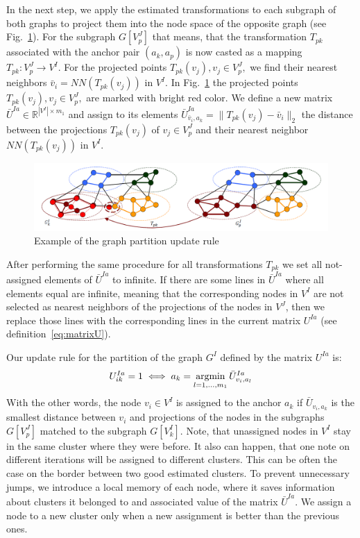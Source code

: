 In the next step, we apply the estimated transformations to each subgraph of both graphs to project them into the node space of the opposite graph (see Fig.~\ref{fig:update}). For the subgraph $G[V^J_p]$ that means, that the transformation $T_{pk}$ associated with the anchor pair $(a_k,a_p)$ is now casted as a mapping $T_{pk}:V^J_p\rightarrow V^I$. For the projected points $T_{pk}(v_j),v_j\in V^J_p,$ we find their nearest neighbors $\bar{v}_i=NN(T_{pk}(v_j))$ in $V^I$. In Fig.~\ref{fig:update} the projected points $T_{pk}(v_j),v_j\in V^J_p,$ are marked with bright red color. We define a new matrix $\bar{U}^{Ia}\in\mathbb{R}^{|V^I|\times m_1}$ and assign to its elements $\bar{U}^{Ia}_{\bar{v}_i,a_k}=\|T_{pk}(v_j)-\bar{v}_i\|_2$ the distance between the projections $T_{pk}(v_j)$ of $v_j\in V^J_p$ and their nearest neighbor $NN(T_{pk}(v_j))$ in $V^I$.

\begin{figure}[h]
	\centering
	\includegraphics[scale=0.35]{chapter2/fig/update.png}
	\caption{Example of the graph partition update rule} \label{fig:update}
\end{figure}

After performing the same procedure for all transformations $T_{pk}$ we set all not-assigned elements of $\bar{U}^{Ia}$ to infinite. If there are some lines in $\bar{U}^{Ia}$ where all elements equal are infinite, meaning that the corresponding nodes in $V^I$ are not selected as nearest neighbors of the projections of the nodes in $V^J$,
then we replace those lines with the corresponding lines in the current matrix $U^{Ia}$ (see definition~\eqref{eq:matrixU}).

Our update rule for the partition of the graph $G^I$ defined by the matrix $U^{Ia}$ is:
\begin{equation}
U^{Ia}_{ik}=1 \iff a_k=\mathop{\rm argmin}_{l=1,\dots,m_1}^{}{\bar{U}^{Ia}_{v_i,a_l}}
\end{equation}
With the other words, the node $v_i\in V^I$ is assigned to the anchor $a_k$ if $\bar{U}_{v_i,a_k}$ is the smallest distance between $v_i$ and projections of the nodes in the subgraphs $G[V^J_p]$ matched to the subgraph $G[V^I_k]$. Note, that unassigned nodes in $V^I$ stay in the same cluster where they were before. It also can happen, that one note on different iterations will be assigned to different clusters. This can be often the case on the border between two good estimated clusters. To prevent unnecessary jumps, we introduce a local memory of each node, where it saves information about clusters it belonged to and associated value of the matrix $\bar{U}^{Ia}$. We assign a node to a new cluster only when a new assignment is better than the previous ones.


